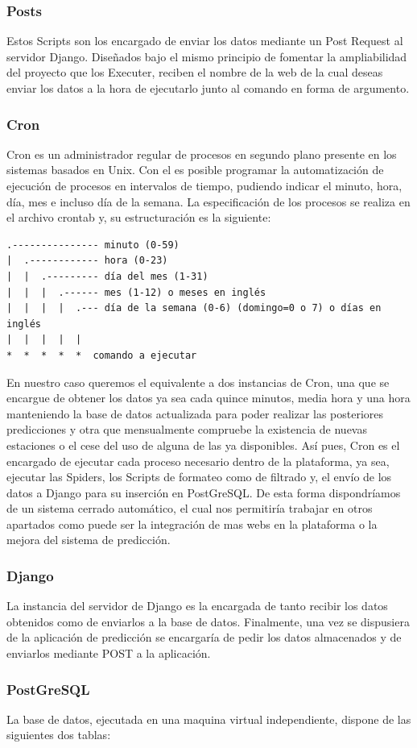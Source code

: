 \subsubsection{Posts}
Estos Scripts son los encargado de enviar los datos mediante un Post Request al servidor Django.\newline
Diseñados bajo el mismo principio de fomentar la ampliabilidad del proyecto que los Executer, reciben el nombre de la web de la cual deseas enviar los datos a la hora de ejecutarlo junto al comando en forma de argumento.

\subsubsection{Cron}
Cron es un administrador regular de procesos en segundo plano presente en los sistemas basados en Unix. Con el es posible programar la automatización de ejecución de procesos en intervalos de tiempo, pudiendo indicar el minuto, hora, día, mes e incluso día de la semana.
\newline
La especificación de los procesos se realiza en el archivo crontab y, su estructuración es la siguiente:
\begin{verbatim}
.--------------- minuto (0-59) 
|  .------------ hora (0-23)
|  |  .--------- día del mes (1-31)
|  |  |  .------ mes (1-12) o meses en inglés
|  |  |  |  .--- día de la semana (0-6) (domingo=0 o 7) o días en inglés 
|  |  |  |  |
*  *  *  *  *  comando a ejecutar
\end{verbatim}

En nuestro caso queremos el equivalente a dos instancias de Cron, una que se encargue de obtener los datos ya sea cada quince minutos, media hora y una hora manteniendo la base de datos actualizada para poder realizar las posteriores predicciones y otra que mensualmente compruebe la existencia de nuevas estaciones o el cese del uso de alguna de las ya disponibles.\newline
Así pues, Cron es el encargado de ejecutar cada proceso necesario dentro de la plataforma, ya sea, ejecutar las Spiders, los Scripts de formateo como de filtrado y, el envío de los datos a Django para su inserción en PostGreSQL.\newline
De esta forma dispondríamos de un sistema cerrado automático, el cual nos permitiría trabajar en otros apartados como puede ser la integración de mas webs en la plataforma o la mejora del sistema de predicción.

\subsubsection{Django}
La instancia del servidor de Django es la encargada de tanto recibir los datos obtenidos como de enviarlos a la base de datos. Finalmente, una vez se dispusiera de la aplicación de predicción se encargaría de pedir los datos almacenados y de enviarlos mediante POST a la aplicación.

\subsubsection{PostGreSQL}
La base de datos, ejecutada en una maquina virtual independiente, dispone de las siguientes dos tablas:





